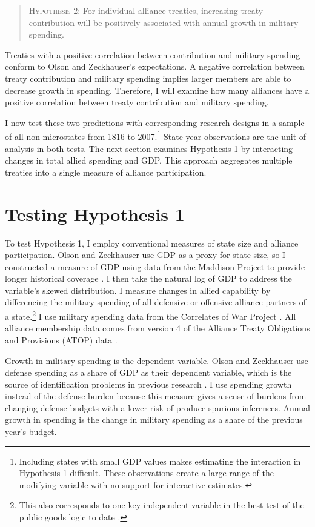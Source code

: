 \documentclass[12pt]{article}
\begin{document}
\begin{quote}
\textsc{Hypothesis 2}: For individual alliance treaties, increasing treaty contribution will be positively associated with annual growth in military spending. 
\end{quote}


Treaties with a positive correlation between contribution and military spending conform to Olson and Zeckhauser's expectations. 
A negative correlation between treaty contribution and military spending implies larger members are able to decrease growth in spending. 
Therefore, I will examine how many alliances have a positive correlation between treaty contribution and military spending.  


I now test these two predictions with corresponding research designs in a sample of all non-microstates from 1816 to 2007.\footnote{Including states with small GDP values makes estimating the interaction in Hypothesis 1 difficult. These observations create a large range of the modifying variable with no support for interactive estimates.}
State-year observations are the unit of analysis in both tests. 
The next section examines Hypothesis 1 by interacting changes in total allied spending and GDP.
This approach aggregates multiple treaties into a single measure of alliance participation. 


\section{Testing Hypothesis 1}

To test Hypothesis 1, I employ conventional measures of state size and alliance participation. 
Olson and Zeckhauser use GDP as a proxy for state size, so I constructed a measure of GDP using data from the Maddison Project to provide longer historical coverage \citep{Boltetal2018}. 
I then take the natural log of GDP to address the variable's skewed distribution. 
I measure changes in allied capability by differencing the military spending of all defensive or offensive alliance partners of a state.\footnote{This also corresponds to one key independent variable in the best test of the public goods logic to date \citep{PluemperNeumayer2015}.}
I use military spending data from the Correlates of War Project \citep{SingerCINC1988}.  
All alliance membership data comes from version 4 of the Alliance Treaty Obligations and Provisions (ATOP) data \citep{Leedsetal2002}.  


Growth in military spending is the dependent variable. 
Olson and Zeckhauser use defense spending as a share of GDP as their dependent variable, which is the source of identification problems in previous research \citep{Kronmal1993, PluemperNeumayer2015}. 
I use spending growth instead of the defense burden because this measure gives a sense of burdens from changing defense budgets with a lower risk of produce spurious inferences. 
Annual growth in spending is the change in military spending as a share of the previous year's budget. 
\end{document}

